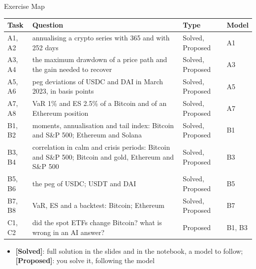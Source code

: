 \begin{frame}{Exercise Map}
\itemsize{\footnotesize}
\begin{center}
\scriptsize
\begin{tabular}{>{\raggedright\arraybackslash}p{1.1cm}>{\raggedright\arraybackslash}p{7.5cm}>{\raggedright\arraybackslash}p{1.9cm}>{\raggedright\arraybackslash}p{1.4cm}}
\toprule
\textbf{Task} & \textbf{Question} & \textbf{Type} & \textbf{Model} \\
\midrule
A1, A2 & annualising a crypto series with 365 and with 252 days & Solved, Proposed & A1 \\
A3, A4 & the maximum drawdown of a price path and the gain needed to recover & Solved, Proposed & A3 \\
A5, A6 & peg deviations of USDC and DAI in March 2023, in basis points & Solved, Proposed & A5 \\
A7, A8 & VaR 1\% and ES 2.5\% of a Bitcoin and of an Ethereum position & Solved, Proposed & A7 \\
B1, B2 & moments, annualisation and tail index: Bitcoin and S\&P 500; Ethereum and Solana & Solved, Proposed & B1 \\
B3, B4 & correlation in calm and crisis periods: Bitcoin and S\&P 500; Bitcoin and gold, Ethereum and S\&P 500 & Solved, Proposed & B3 \\
B5, B6 & the peg of USDC; USDT and DAI & Solved, Proposed & B5 \\
B7, B8 & VaR, ES and a backtest: Bitcoin; Ethereum & Solved, Proposed & B7 \\
C1, C2 & did the spot ETFs change Bitcoin? what is wrong in an AI answer? & Proposed & B1, B3 \\
\bottomrule
\end{tabular}
\end{center}
\begin{itemize}
    \item \textbf{[Solved]}: full solution in the slides and in the notebook, a model to follow; \textbf{[Proposed]}: you solve it, following the model
\end{itemize}
\end{frame}

